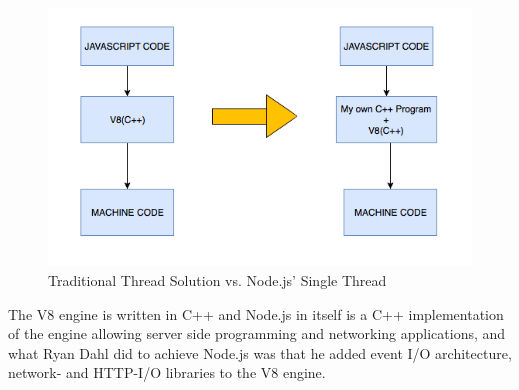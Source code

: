 \begin{figure}[h!]
  \centering
  \includegraphics[scale=0.5]{figs/v8engine.png}
  \caption{Traditional Thread Solution vs. Node.js' Single Thread
  \cite{article:v8engine}}
\end{figure}

The V8 engine is written in C++ and Node.js in itself is a C++ implementation of the engine allowing server side programming and networking applications, and what Ryan Dahl did to achieve Node.js was that he added event I/O architecture, network- and HTTP-I/O libraries to the V8 engine. \cite{article:v8engine}

